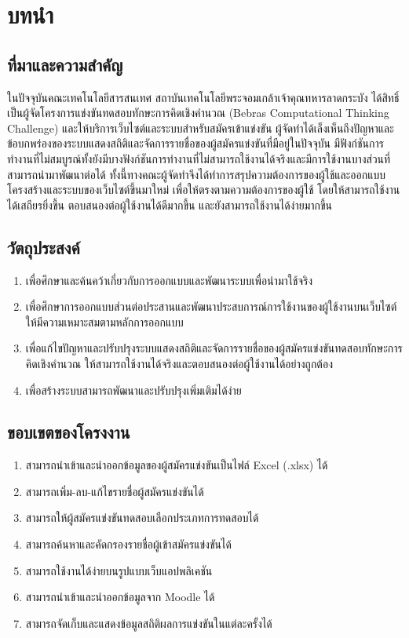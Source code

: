 \chapter{บทนำ}
\label{chapter:introduction}

\section{ที่มาและความสำคัญ}

ในปัจจุบันคณะเทคโนโลยีสารสนเทศ สถาบันเทคโนโลยีพระจอมเกล้าเจ้าคุณทหารลาดกระบัง ได้สิทธิ์เป็นผู้จัดโครงการแข่งขันทดสอบทักษะการคิดเชิงคำนวณ (Bebras Computational Thinking Challenge) และให้บริการเว็บไซต์และระบบสำหรับสมัครเข้าแข่งขัน ผู้จัดทำได้เล็งเห็นถึงปัญหาและข้อบกพร่องของระบบแสดงสถิติและจัดการรายชื่อของผู้สมัครแข่งขันที่มีอยู่ในปัจจุบัน มีฟังก์ชันการทำงานที่ไม่สมบูรณ์ทั้งยังมีบางฟังก์ชันการทำงานที่ไม่สามารถใช้งานได้จริงและมีการใช้งานบางส่วนที่สามารถนำมาพัฒนาต่อได้ ทั้งนี้ทางคณะผู้จัดทำจึงได้ทำการสรุปความต้องการของผู้ใช้และออกแบบโครงสร้างและระบบของเว็บไซต์ขึ้นมาใหม่ เพื่อให้ตรงตามความต้องการของผู้ใช้ โดยให้สามารถใช้งานได้เสถียรยิ่งขึ้น ตอบสนองต่อผู้ใช้งานได้ดีมากขึ้น และยังสามารถใช้งานได้ง่ายมากขึ้น

\section{วัตถุประสงค์}
\begin{enumerate}
    \item เพื่อศึกษาและค้นคว้าเกี่ยวกับการออกแบบและพัฒนาระบบเพื่อนำมาใช้จริง
    \item เพื่อศึกษาการออกแบบส่วนต่อประสานและพัฒนาประสบการณ์การใช้งานของผู้ใช้งานบนเว็บไซต์ ให้มีความเหมาะสมตามหลักการออกแบบ
    \item เพื่อแก้ไขปัญหาและปรับปรุงระบบแสดงสถิติและจัดการรายชื่อของผู้สมัครแข่งขันทดสอบทักษะการคิดเชิงคำนวณ ให้สามารถใช้งานได้จริงและตอบสนองต่อผู้ใช้งานได้อย่างถูกต้อง
    \item เพื่อสร้างระบบสามารถพัฒนาและปรับปรุงเพิ่มเติมได้ง่าย
\end{enumerate}

\section{ขอบเขตของโครงงาน}
\begin{enumerate}
    \item สามารถนำเข้าและนำออกข้อมูลของผู้สมัครแข่งขันเป็นไฟล์ Excel (.xlsx) ได้
    \item สามารถเพิ่ม-ลบ-แก้ไขรายชื่อผู้สมัครแข่งขันได้
    \item สามารถให้ผู้สมัครแข่งขันทดสอบเลือกประเภทการทดสอบได้
    \item สามารถค้นหาและคัดกรองรายชื่อผู้เข้าสมัครแข่งขันได้
    \item สามารถใช้งานได้ง่ายบนรูปแบบเว็บแอปพลิเคชัน
    \item สามารถนำเข้าและนำออกข้อมูลจาก Moodle ได้
    \item สามารถจัดเก็บและแสดงข้อมูลสถิติผลการแข่งขันในแต่ละครั้งได้
\end{enumerate}

